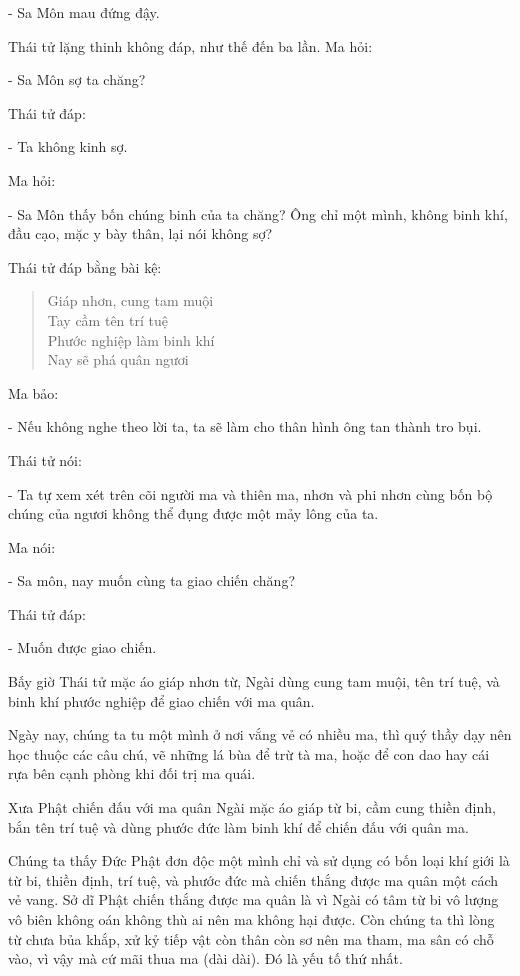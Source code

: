 \documentclass[
  12pt,
  oneside]{book}
\begin{document}
- Sa Môn mau đứng đậy.

Thái tử lặng thinh không đáp, như thế đến ba lần. Ma hỏi:

- Sa Môn sợ ta chăng?

Thái tử đáp:

- Ta không kinh sợ.

Ma hỏi:

- Sa Môn thấy bốn chúng binh của ta chăng? Ông chỉ một mình, không binh khí, đầu cạo, mặc y bày thân, lại nói không sợ?

Thái tử đáp bằng bài kệ:

\begin{quote}
Giáp nhơn, cung tam muội\\
Tay cầm tên trí tuệ\\
Phước nghiệp làm binh khí\\
Nay sẽ phá quân ngươi
\end{quote}

Ma bảo:

- Nếu không nghe theo lời ta, ta sẽ làm cho thân hình ông tan thành tro bụi.

Thái tử nói:

- Ta tự xem xét trên cõi người ma và thiên ma, nhơn và phi nhơn cùng bốn bộ chúng của ngươi không thể đụng được một mảy lông của ta.

Ma nói:

- Sa môn, nay muốn cùng ta giao chiến chăng?

Thái tử đáp:

- Muốn được giao chiến.

Bấy giờ Thái tử mặc áo giáp nhơn từ, Ngài dùng cung tam muội, tên trí tuệ, và binh khí phước nghiệp để giao chiến với ma quân.

Ngày nay, chúng ta tu một mình ở nơi vắng vẻ có nhiều ma, thì quý thầy dạy nên học thuộc các câu chú, vẽ những lá bùa để trừ tà ma, hoặc để con dao hay cái rựa bên cạnh phòng khi đối trị ma quái.

Xưa Phật chiến đấu với ma quân Ngài mặc áo giáp từ bi, cầm cung thiền định, bắn tên trí tuệ và dùng phước đức làm binh khí để chiến đấu với quân ma.

Chúng ta thấy Đức Phật đơn độc một mình chỉ và sử dụng có bốn loại khí giới là từ bi, thiền định, trí tuệ, và phước đức mà chiến thắng được ma quân một cách vẻ vang. Sở dĩ Phật chiến thắng được ma quân là vì Ngài có tâm từ bi vô lượng vô biên không oán không thù ai nên ma không hại được. Còn chúng ta thì lòng từ chưa bủa khắp, xử kỷ tiếp vật còn thân còn sơ nên ma tham, ma sân có chỗ vào, vì vậy mà cứ mãi thua ma (dài dài). Đó là yếu tố thứ nhất.
\end{document}
